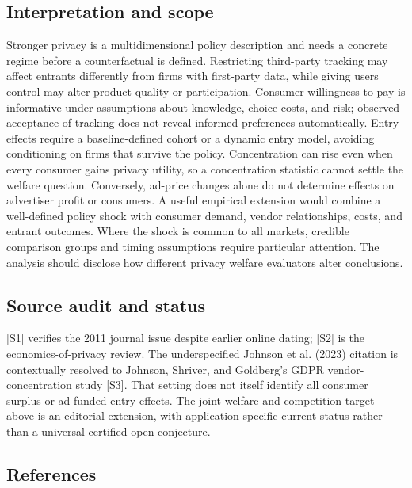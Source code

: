\documentclass[11pt,a4paper]{article}
\begin{document}
\subsection*{Interpretation and scope}

Stronger privacy is a multidimensional policy description and needs a concrete regime before a counterfactual is defined. Restricting third-party tracking may affect entrants differently from firms with first-party data, while giving users control may alter product quality or participation. Consumer willingness to pay is informative under assumptions about knowledge, choice costs, and risk; observed acceptance of tracking does not reveal informed preferences automatically. Entry effects require a baseline-defined cohort or a dynamic entry model, avoiding conditioning on firms that survive the policy. Concentration can rise even when every consumer gains privacy utility, so a concentration statistic cannot settle the welfare question. Conversely, ad-price changes alone do not determine effects on advertiser profit or consumers. A useful empirical extension would combine a well-defined policy shock with consumer demand, vendor relationships, costs, and entrant outcomes. Where the shock is common to all markets, credible comparison groups and timing assumptions require particular attention. The analysis should disclose how different privacy welfare evaluators alter conclusions.

\subsection*{Source audit and status}

[S1] verifies the 2011 journal issue despite earlier online dating; [S2] is the economics-of-privacy review. The underspecified Johnson et al. (2023) citation is contextually resolved to Johnson, Shriver, and Goldberg's GDPR vendor-concentration study [S3]. That setting does not itself identify all consumer surplus or ad-funded entry effects. The joint welfare and competition target above is an editorial extension, with application-specific current status rather than a universal certified open conjecture.

\subsection*{References}
\end{document}
